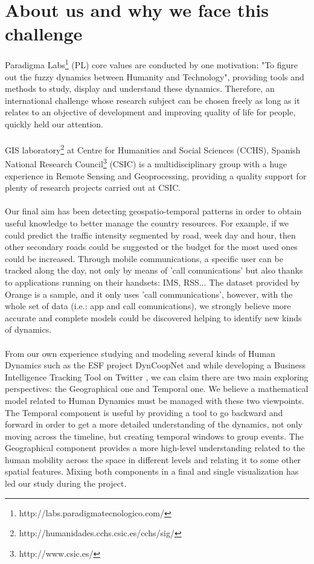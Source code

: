 \newpage

\section{About us and why we face this challenge}

Paradigma Labs\footnote{http://labs.paradigmatecnologico.com/} (PL) core values are conducted by one motivation: "To figure out the fuzzy dynamics between Humanity and Technology", providing tools and methods to study, display and understand these dynamics. Therefore, an international challenge whose research subject can be chosen freely as long as it relates to an objective of development and improving quality of life for people, quickly held our attention.
\\
\\
GIS laboratory\footnote{http://humanidades.cchs.csic.es/cchs/sig/} at Centre for Humanities and Social Sciences (CCHS), Spanish National Research Council\footnote{http://www.csic.es/} (CSIC) is a multidisciplinary group with a huge experience in Remote Sensing and Geoprocessing, providing a quality support for plenty of research projects carried out at CSIC.
\\
\\
Our final aim has been detecting geospatio-temporal patterns in order to obtain useful knowledge to better manage the country resources. For example, if we could predict the traffic intensity segmented by road, week day and hour, then other secondary roads could be suggested or the budget for the most used ones could be increased. Through mobile communications, a specific user can be tracked along the day, not only by means of 'call comunications' but also thanks to applications running on their handsets: IMS, RSS... The dataset provided by Orange is a sample, and it only uses 'call communications', however, with the whole set of data (i.e.: app and call comunications), we strongly believe more accurate and complete models could be discovered helping to identify new kinds of dynamics.
\\
\\
From our own experience studying and modeling several kinds of Human Dynamics such as the ESF project DynCoopNet\citep{dyncoopnet2012} and while developing a Business Intelligence Tracking Tool on Twitter \citep{labselecciones}, we can claim there are two main exploring perspectives: the Geographical one and Temporal one. We believe a mathematical model related to Human Dynamics must be managed with these two viewpoints. The Temporal component is useful by providing a tool to go backward and forward in order to get a more detailed understanding of the dynamics, not only moving across the timeline, but  creating temporal windows to group events. The Geographical component provides a more high-level understanding related to the human mobility across the space in different levels and relating it to some other spatial features. Mixing both components in a final and single visualization has led our study during the project.
